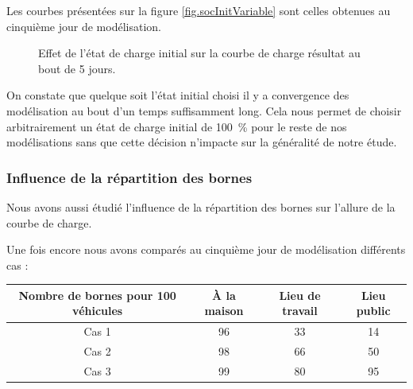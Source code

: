 				Les courbes présentées sur la figure \vref{fig.socInitVariable} sont celles obtenues au cinquième jour de modélisation.
				
				\begin{figure}[!h]
					\centering
					\caption{Effet de l'état de charge initial sur la courbe de charge résultat au bout de 5 jours. \label{fig.socInitVariable}}
				\end{figure}			
				
				On constate que quelque soit l'état initial choisi il y a convergence des modélisation au bout d'un temps suffisamment long. Cela nous permet de choisir arbitrairement un état de charge initial de \SI{100}{\percent} pour le reste de nos modélisations sans que cette décision n'impacte sur la généralité de notre étude. 
		
				
				\subsubsection{Influence de la répartition des bornes}
				
				Nous avons aussi étudié l'influence de la répartition des bornes sur l'allure de la courbe de charge.
				
				Une fois encore nous avons comparés au cinquième jour de modélisation différents cas : 
				\begin{table}[h!]
				\centering
				\begin{tabular}{|c||c|c|c|}
					\hline
					Nombre de bornes pour 100 véhicules & À la maison & Lieu de travail & Lieu public \\
					\hline
					Cas 1 & 96 & 33 & 14 \\
					\hline
					Cas 2 & 98 & 66 & 50\\
					\hline
					Cas 3 & 99 & 80 & 95\\
					\hline
				\end{tabular}
				\end{table}		
				

